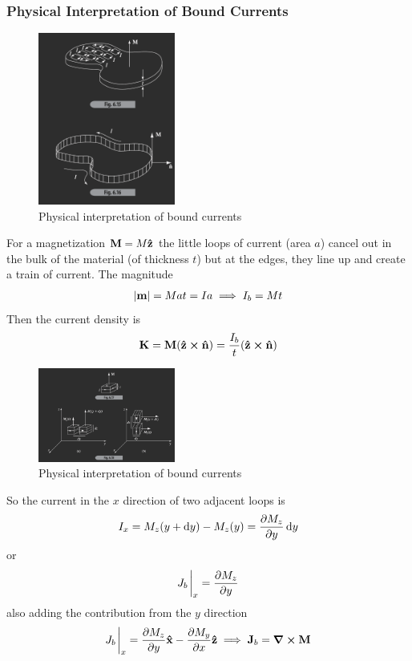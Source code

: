\documentclass[../main.tex]{subfiles}
\begin{document}
\subsubsection{Physical Interpretation of Bound Currents}
\begin{figure}[ht]
    \centering
    \includegraphics[width=0.4\textwidth]{fig6_15_16.png}
    \caption{Physical interpretation of bound currents}
    \label{fig:gr6_15_16}
\end{figure}
For a magnetization $\vb M = M \vu z$ 
the little loops of current (area $a$) cancel out in the bulk of the material (of thickness $t$) but at the edges, they line up and create a train of current.
The magnitude 
\begin{align*}
    \abs{\vb m} = M at = I a \implies I_b = Mt
\end{align*}
Then the current density is
\begin{align*}
    \vb K = \vb M (\vu z \cross \vu n) = \frac{I_b}{t} (\vu z \cross \vu n)
\end{align*}
\begin{figure}[ht]
    \centering
    \includegraphics[width=0.4\textwidth]{fig6_17_18.png}
    \caption{Physical interpretation of bound currents}
    \label{fig:gr6_17_18}
\end{figure}
So the current in the $x$ direction of two
adjacent loops is
\begin{align*}
    I_x = M_z (y + \dd{y}) - M_z(y) = \pdv{M_z}{y} \dd{y} 
\end{align*}
or
\begin{align*}
    J_b \eval_x = \pdv{M_z}{y}
\end{align*}
also adding the contribution from the $y$ direction
\begin{align*}
    J_b \eval_x = \pdv{M_z}{y} \vu x - \pdv{M_y}{x} \vu z \implies \vb J_b = \grad \cross \vb M
\end{align*}
\end{document}
